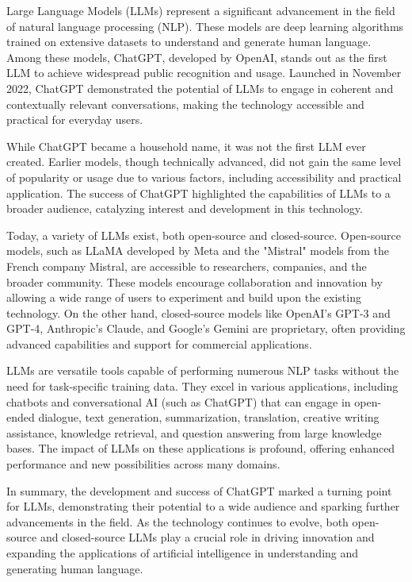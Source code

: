 \documentclass{article}
\begin{document}
Large Language Models (LLMs) represent a significant advancement
in the field of natural language processing (NLP).
These models are deep learning algorithms trained on extensive
datasets to understand and generate human language.
Among these models, ChatGPT, developed by OpenAI, stands
out as the first LLM to achieve widespread public recognition and usage.
Launched in November 2022, ChatGPT demonstrated the potential of
LLMs to engage in coherent and contextually relevant conversations,
making the technology accessible and practical for everyday users.

While ChatGPT became a household name, it was not the first LLM ever created.
Earlier models, though technically advanced, did not gain the same
level of popularity or usage due to various factors, including
accessibility and practical application. The success of ChatGPT highlighted
the capabilities of LLMs to a broader audience, catalyzing interest
and development in this technology.

Today, a variety of LLMs exist, both open-source and closed-source.
Open-source models, such as LLaMA developed by Meta and the "Mistral"
models from the French company Mistral, are accessible to researchers,
companies, and the broader community. These models encourage
collaboration and innovation by allowing a wide range of users
to experiment and build upon the existing technology. On the other hand,
closed-source models like OpenAI's GPT-3 and GPT-4, Anthropic's Claude,
and Google's Gemini are proprietary, often providing advanced
capabilities and support for commercial applications.

LLMs are versatile tools capable of performing numerous NLP
tasks without the need for task-specific training data.
They excel in various applications, including chatbots and
conversational AI (such as ChatGPT) that can engage
in open-ended dialogue, text generation, summarization,
translation, creative writing assistance, knowledge retrieval,
and question answering from large knowledge bases.
The impact of LLMs on these applications is profound,
offering enhanced performance and new possibilities across many domains.

In summary, the development and success of ChatGPT marked
a turning point for LLMs, demonstrating their potential
to a wide audience and sparking further advancements in the field.
As the technology continues to evolve, both open-source and closed-source
LLMs play a crucial role in driving innovation and expanding the applications
of artificial intelligence in understanding and generating human language.
\end{document}
